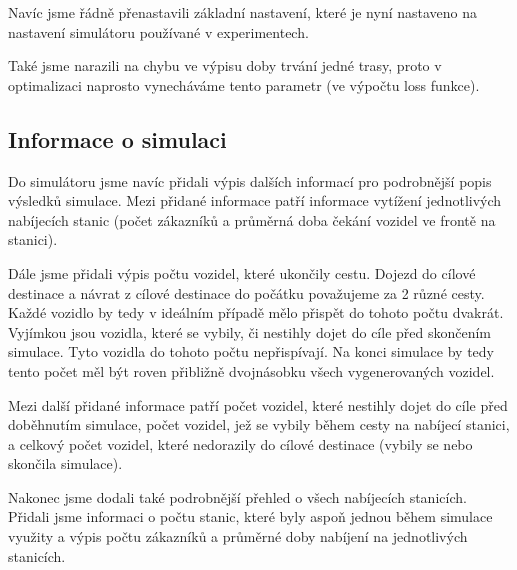 Navíc jsme řádně přenastavili základní nastavení, které je nyní nastaveno na nastavení
simulátoru používané v experimentech.

Také jsme narazili na chybu ve výpisu doby trvání jedné trasy, proto v optimalizaci naprosto
vynecháváme tento parametr (ve výpočtu loss funkce).


\subsection{Informace o simulaci}
Do simulátoru jsme navíc přidali výpis dalších informací pro podrobnější popis výsledků simulace. 
Mezi přidané informace patří informace vytížení jednotlivých nabíjecích stanic (počet zákazníků
a průměrná doba čekání vozidel ve frontě na stanici). 

Dále jsme přidali výpis počtu vozidel, které ukončily cestu. Dojezd do cílové destinace a návrat 
z cílové destinace do počátku považujeme
za 2 různé cesty. Každé vozidlo by tedy v ideálním případě mělo přispět do tohoto počtu dvakrát.
Vyjímkou jsou vozidla, které se vybily, či nestihly dojet do cíle před skončením simulace.
Tyto vozidla do tohoto počtu nepřispívají. Na konci simulace by tedy tento počet měl být roven 
přibližně dvojnásobku všech vygenerovaných vozidel.

Mezi další přidané informace patří počet vozidel, které nestihly dojet do cíle před 
doběhnutím simulace, počet vozidel, jež se vybily během cesty na nabíjecí stanici, a 
celkový počet vozidel, které nedorazily do cílové destinace (vybily se nebo skončila simulace).

Nakonec jsme dodali také podrobnější přehled o všech nabíjecích stanicích. Přidali jsme
informaci o počtu stanic, které byly aspoň jednou během simulace využity a výpis počtu zákazníků 
a průměrné doby nabíjení na jednotlivých stanicích.


